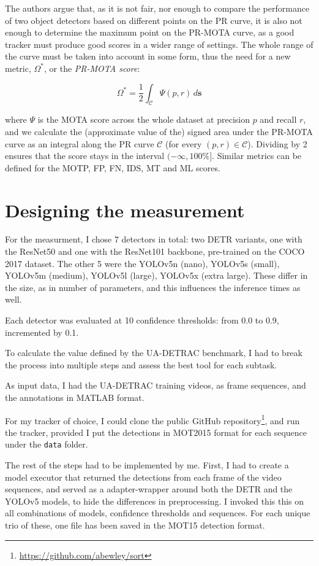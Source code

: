 The authors argue that, as it is not fair, nor enough to compare the performance of two object detectors based on different points on the PR curve, it is also not enough to determine the maximum point on the PR-MOTA curve, as a good tracker must produce good scores in a wider range of settings. The whole range of the curve must be taken into account in some form, thus the need for a new metric, $\Omega^{*}$, or the \textit{PR-MOTA score}:

\[ \Omega^{*} = \frac{1}{2}\int_{\mathcal{C}} \Psi(p, r) \,d\textbf{s} \]

where $\Psi$ is the MOTA score across the whole dataset at precision $p$ and recall $r$, and we calculate the (approximate value of the) signed area under the PR-MOTA curve as an integral along the PR curve $\mathcal{C}$ (for every $(p, r) \in \mathcal{C}$). Dividing by 2 ensures that the score stays in the interval $(-\infty, 100\%]$. Similar metrics can be defined for the MOTP, FP, FN, IDS, MT and ML scores.

\section{Designing the measurement}

For the measurment, I chose 7 detectors in total: two DETR variants, one with the ResNet50 and one with the ResNet101 backbone, pre-trained on the COCO 2017 dataset. The other 5 were the YOLOv5n (nano), YOLOv5s (small), YOLOv5m (medium), YOLOv5l (large), YOLOv5x (extra large). These differ in the size, as in number of parameters, and this influences the inference times as well.

Each detector was evaluated at 10 confidence thresholds: from 0.0 to 0.9, incremented by 0.1.

To calculate the value defined by the UA-DETRAC benchmark, I had to break the process into multiple steps and assess the best tool for each subtask.

As input data, I had the UA-DETRAC training videos, as frame sequences, and the annotations in MATLAB format.

For my tracker of choice, I could clone the public GitHub repository\footnote{\url{https://github.com/abewley/sort}}, and run the tracker, provided I put the detections in MOT2015 format for each sequence under the \verb|data| folder.

The rest of the steps had to be implemented by me. First, I had to create a model executor that returned the detections from each frame of the video sequences, and served as a adapter-wrapper around both the DETR and the YOLOv5 models, to hide the differences in preprocessing. I invoked this this on all combinations of models, confidence thresholds and sequences. For each unique trio of these, one file has been saved in the MOT15 detection format.

